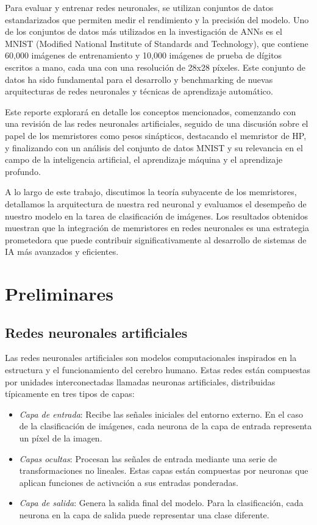 \documentclass[conference]{IEEEtran}
\begin{document}
Para evaluar y entrenar redes neuronales, se utilizan conjuntos de datos estandarizados que permiten medir el rendimiento y la precisión del modelo. Uno de los conjuntos de datos más utilizados en la investigación de ANNs es el MNIST (Modified National Institute of Standards and Technology), que contiene 60,000 imágenes de entrenamiento y 10,000 imágenes de prueba de dígitos escritos a mano, cada una con una resolución de 28x28 píxeles. Este conjunto de datos ha sido fundamental para el desarrollo y benchmarking de nuevas arquitecturas de redes neuronales y técnicas de aprendizaje automático.

Este reporte explorará en detalle los conceptos mencionados, comenzando con una revisión de las redes neuronales artificiales, seguido de una discusión sobre el papel de los memristores como pesos sinápticos, destacando el memristor de HP, y finalizando con un análisis del conjunto de datos MNIST y su relevancia en el campo de la inteligencia artificial, el aprendizaje máquina y el aprendizaje profundo.

A lo largo de este trabajo, discutimos la teoría subyacente de los memristores, detallamos la arquitectura de nuestra red neuronal y evaluamos el desempeño de nuestro modelo en la tarea de clasificación de imágenes. Los resultados obtenidos muestran que la integración de memristores en redes neuronales es una estrategia prometedora que puede contribuir significativamente al desarrollo de sistemas de IA más avanzados y eficientes.

\section{Preliminares}

\subsection{Redes neuronales artificiales}
Las redes neuronales artificiales son modelos computacionales inspirados en la estructura y el funcionamiento del cerebro humano. Estas redes están compuestas por unidades interconectadas llamadas neuronas artificiales, distribuidas típicamente en tres tipos de capas:

\begin{itemize}
	\item \textit{Capa de entrada}: Recibe las señales iniciales del entorno externo. En el caso de la clasificación de imágenes, cada neurona de la capa de entrada representa un píxel de la imagen.
	\item \textit{Capas ocultas}: Procesan las señales de entrada mediante una serie de transformaciones no lineales. Estas capas están compuestas por neuronas que aplican funciones de activación a sus entradas ponderadas.
	\item \textit{Capa de salida}: Genera la salida final del modelo. Para la clasificación, cada neurona en la capa de salida puede representar una clase diferente.
\end{itemize}
\end{document}
